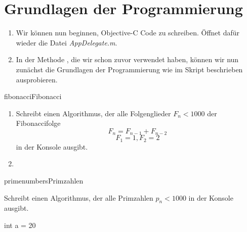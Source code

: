 \documentclass[parskip=half, final]{scrreprt}
\begin{document}
\begin{lecture}
\begin{enumerate}
\end{enumerate}


\section{Grundlagen der Programmierung}

\begin{enumerate}

\item Wir können nun beginnen, Objective-C Code zu schreiben. Öffnet dafür wieder die Datei \emph{AppDelegate.m}.

\item In der Methode , die wir schon zuvor verwendet haben, können wir nun zunächst die Grundlagen der Programmierung wie im Skript beschrieben ausprobieren.

\end{enumerate}

\begin{exc}

\begin{excitem}{fibonacci}{Fibonacci}

\begin{enumerate}
\item Schreibt einen Algorithmus, der alle Folgenglieder $F_n < 1000$ der Fibonaccifolge
\begin{equation}
F_n = F_{n-1} + F_{n-2}
\end{equation}
\begin{equation}
F_1=1, F_2=2
\end{equation}
in der Konsole ausgibt.
\item {}
\end{enumerate}

\end{excitem}

\begin{excitem}{primenumbers}{Primzahlen}

Schreibt einen Algorithmus, der alle Primzahlen $p_n<1000$ in der Konsole ausgibt. 


\begin{objclst}
int a = 20%
\end{objclst}

\end{excitem}

\end{exc}


\end{lecture}
\end{document}

